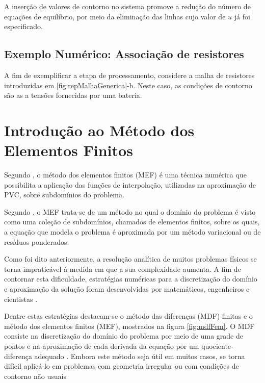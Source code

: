 \documentclass[
    12pt,               %
    openright,          %
    oneside,
    a4paper,            %
    english,            %
    french,             %
    spanish,            %
    brazil              %
    ]{abntex2}
\begin{document}
A inserção de valores de contorno no sistema promove a redução do número de equações de equilíbrio, por meio da eliminação das linhas cujo valor de $u$ já foi especificado.

\subsection{Exemplo Numérico: Associação de resistores}

A fim de exemplificar a etapa de processamento,  considere a malha de resistores introduzidas  em \ref{fig:repMalhaGenerica}-b. Neste caso, as condições de contorno são as a tensões fornecidas por uma bateria.



\section{Introdução ao Método dos Elementos Finitos}
\label{sec:MEF}

Segundo , o método dos elementos finitos (MEF) é uma técnica numérica que possibilita a aplicação das funções de interpolação, utilizadas na aproximação de PVC, sobre subdomínios do problema.

Segundo , o MEF trata-se de um método no qual o domínio do problema é visto como uma coleção de subdomínios, chamados de elementos finitos, sobre os quais, a equação que modela o problema é aproximada por um método variacional ou de resíduos ponderados.



Como foi dito anteriormente, a resolução analítica de muitos problemas físicos se torna impraticável à medida em que a sua  complexidade aumenta. 
A fim de contornar esta dificuldade, estratégias numéricas para a discretização do domínio e aproximação da solução foram desenvolvidas por matemáticos, engenheiros e cientistas \cite[p. 1]{zien}. 

Dentre estas estratégias destacam-se o método das diferenças (MDF) finitas e o método dos elementos finitos (MEF), mostrados na figura \ref{fig:mdfFem}. O MDF consiste na discretização do domínio do problema por meio de uma grade de pontos e na aproximação de cada derivada da equação por um quociente-diferença adequado
\cite[p. 684]{burdenFaires}. Embora este método seja útil em muitos casos, se torna difícil aplicá-lo em problemas com geometria irregular ou com condições de contorno não usuais \cite[p. 4]{huebner}
\end{document}
